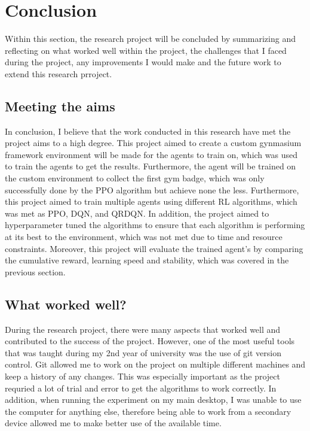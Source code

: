  \section{Conclusion}

Within this section, the research project will be concluded by summarizing and reflecting on what worked well within the project, the challenges that I faced during the project, any improvements I would make and the future work to extend this research prroject.

\subsection{Meeting the aims}

In conclusion, I believe that the work conducted in this research have met the project aims to a high degree. This project aimed to create a custom gynmasium framework environment will be made for the agents to train on, which was used to train the agents to get the results. Furthermore, the agent will be trained on the custom environment to collect the first gym badge, which was only successfully done by the PPO algorithm but achieve none the less. Furthermore, this project aimed to train multiple agents using different RL algorithms, which was met as PPO, DQN, and QRDQN. In addition, the project aimed to hyperparameter tuned the algorithms to ensure that each algorithm is performing at its best to the environment, which was not met due to time and resource constraints. Moreover, this project will evaluate the trained agent's by comparing the cumulative reward, learning speed and stability, which was covered in the previous section. 

\subsection{What worked well?}

During the research project, there were many aspects that worked well and contributed to the success of the project. However, one of the most useful tools that was taught during my 2nd year of university was the use of git version control. Git allowed me to work on the project on multiple different machines and keep a history of any changes. This was especially important as the project requried a lot of trial and error to get the algorithms to work correctly. In addition, when running the experiment on my main desktop, I was unable to use the computer for anything else, therefore being able to work from a secondary device allowed me to make better use of the available time.  

